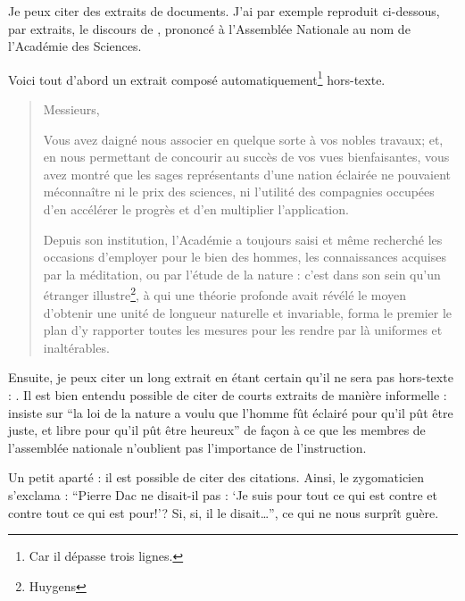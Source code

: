 \documentclass[12pt,space=onehalf,version=final]{yathesis}
\begin{document}
Je peux citer des extraits de
documents. J'ai par exemple reproduit ci-dessous, par extraits, le discours de
\citeauthor{cond}, prononcé à l'Assemblée Nationale au nom de l'Académie des
Sciences.

Voici tout d'abord un extrait composé automatiquement\footnote{Car il dépasse
  trois lignes.} \og hors-texte\fg{}.
%
\blockcquote[pp.~508-509]{cond}{%
  Messieurs,

  Vous avez daigné nous associer en quelque sorte à vos nobles
  travaux; et, en nous permettant de concourir au succès de vos vues
  bienfaisantes, vous avez montré que les sages représentants d'une
  nation éclairée ne pouvaient méconnaître ni le prix des sciences, ni
  l'utilité des compagnies occupées d'en accélérer le progrès et d'en
  multiplier l'application.

  Depuis son institution, l'Académie a toujours saisi et même
  recherché les occasions d'employer pour le bien des hommes, les
  connaissances acquises par la méditation, ou par l'étude de la
  nature : c'est dans son sein qu'un étranger
  illustre\footnote{Huygens}, à qui une théorie profonde avait révélé
  le moyen d'obtenir une unité de longueur naturelle et invariable,
  forma le premier le plan d'y rapporter toutes les mesures pour les
  rendre par là uniformes et inaltérables.
}

Ensuite, je peux citer un long extrait en étant certain qu'il ne
sera pas \og hors-texte\fg{} :
. Il est bien entendu possible de citer de courts extraits
de manière informelle : \citeauthor{cond}
insiste sur \enquote{la loi de la nature a voulu que
  l'homme fût éclairé pour qu'il pût être juste, et libre pour qu'il
  pût être heureux} de façon à ce que les membres de l'assemblée
nationale n'oublient pas l'importance de l'instruction.

Un petit aparté : il est possible de citer des
citations. Ainsi, le zygomaticien
s'exclama : \enquote{Pierre Dac ne disait-il pas : \enquote{Je suis
    pour tout ce qui est contre et contre tout ce qui est pour!}?
  Si, si, il le disait\ldots{}}, ce qui ne nous surprît guère.
\end{document}
